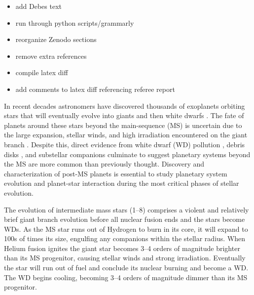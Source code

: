 \documentclass[twocolumn]{aastex631}
\begin{document}
\begin{itemize}
    \item add Debes text
    \item run through python scripts/grammarly
    \item reorganize Zenodo sections
    \item remove extra references
    \item compile latex diff
    \item add comments to latex diff referencing referee report
\end{itemize}

In recent decades astronomers have discovered thousands of exoplanets orbiting stars that will eventually evolve into giants and then white dwarfs \citep{akesonNASAExoplanetArchive2013}. The fate of planets around these stars beyond the main-sequence (MS) is uncertain due to the large expansion, stellar winds, and high irradiation encountered on the giant branch \citep{verasPostmainsequencePlanetarySystem2016}. Despite this, direct evidence from white dwarf (WD) pollution \citep{juraExternallyPollutedWhite2007,xuSpitzerObservationsWhite2012}, debris disks \citep{deruyterKeplerianDiscsPostAGB2006,zuckermanAncientPlanetarySystems2010,koesterFrequencyPlanetaryDebris2014}, and substellar companions \citep[e.g.,][]{luhmanDiscoveryCandidateCoolest2011,vanderburgGiantPlanetCandidate2020,blackmanJovianAnalogueOrbiting2021} culminate to suggest planetary systems beyond the MS are more common than previously thought. Discovery and characterization of post-MS planets is essential to study planetary system evolution and planet-star interaction during the most critical phases of stellar evolution.

The evolution of intermediate mass stars (\qtyrange{1}{8}{\solarmass}) comprises a violent and relatively brief giant branch evolution before all nuclear fusion ends and the stars become WDs. As the MS star runs out of Hydrogen to burn in its core, it will expand to 100s of times its size, engulfing any companions within the stellar radius. When Helium fusion ignites the giant star becomes \numrange{3}{4} orders of magnitude brighter than its MS progenitor, causing stellar winds and strong irradiation. Eventually the star will run out of fuel and conclude its nuclear burning and become a WD. The WD begins cooling, becoming \numrange{3}{4} orders of magnitude dimmer than its MS progenitor.
\end{document}
